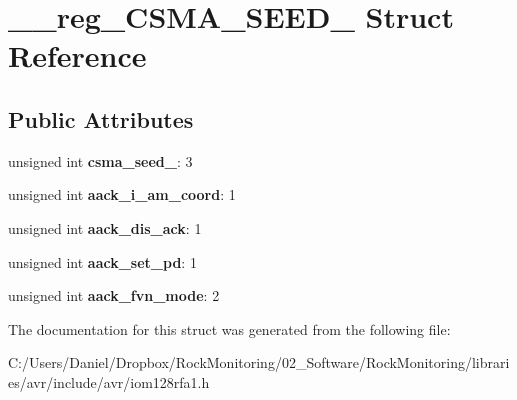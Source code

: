 \hypertarget{struct____reg___c_s_m_a___s_e_e_d__1}{}\section{\+\_\+\+\_\+reg\+\_\+\+C\+S\+M\+A\+\_\+\+S\+E\+E\+D\+\_ Struct Reference}
\label{struct____reg___c_s_m_a___s_e_e_d__1}
\subsection*{Public Attributes}
\begin{DoxyCompactItemize}
\item 
unsigned int {\bfseries csma\+\_\+seed\+\_}\+: 3\hypertarget{struct____reg___c_s_m_a___s_e_e_d__1_a7ad54c1b143615c3ef05fc0b3f668076}{}\label{struct____reg___c_s_m_a___s_e_e_d__1_a7ad54c1b143615c3ef05fc0b3f668076}

\item 
unsigned int {\bfseries aack\+\_\+i\+\_\+am\+\_\+coord}\+: 1\hypertarget{struct____reg___c_s_m_a___s_e_e_d__1_ac4cf52d1ef8627308d6879e0348b48ec}{}\label{struct____reg___c_s_m_a___s_e_e_d__1_ac4cf52d1ef8627308d6879e0348b48ec}

\item 
unsigned int {\bfseries aack\+\_\+dis\+\_\+ack}\+: 1\hypertarget{struct____reg___c_s_m_a___s_e_e_d__1_a586c1b085c3aed7a4a1183eb9202c5ae}{}\label{struct____reg___c_s_m_a___s_e_e_d__1_a586c1b085c3aed7a4a1183eb9202c5ae}

\item 
unsigned int {\bfseries aack\+\_\+set\+\_\+pd}\+: 1\hypertarget{struct____reg___c_s_m_a___s_e_e_d__1_aa3a57bd8deebe9f89fc4918af99badb3}{}\label{struct____reg___c_s_m_a___s_e_e_d__1_aa3a57bd8deebe9f89fc4918af99badb3}

\item 
unsigned int {\bfseries aack\+\_\+fvn\+\_\+mode}\+: 2\hypertarget{struct____reg___c_s_m_a___s_e_e_d__1_af15d8c82f60f0664edf6f1b1dadb4586}{}\label{struct____reg___c_s_m_a___s_e_e_d__1_af15d8c82f60f0664edf6f1b1dadb4586}

\end{DoxyCompactItemize}


The documentation for this struct was generated from the following file\+:\begin{DoxyCompactItemize}
\item 
C\+:/\+Users/\+Daniel/\+Dropbox/\+Rock\+Monitoring/02\+\_\+\+Software/\+Rock\+Monitoring/libraries/avr/include/avr/iom128rfa1.\+h\end{DoxyCompactItemize}
